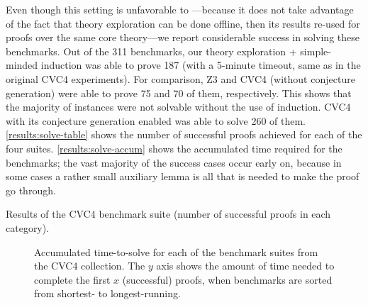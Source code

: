 Even though this setting is unfavorable to \TheSy---because it does not take advantage of the fact that theory exploration can be done offline, then its results re-used for proofs over the same core theory---we report considerable success in solving these benchmarks.
Out of the 311 benchmarks, our theory exploration + simple-minded induction was able to prove 187 (with a 5-minute timeout, same as in the original CVC4 experiments).
For comparison, Z3 and CVC4 (without conjecture generation) were able to prove 75 and 70 of them, respectively.
This shows that the majority of instances were not solvable without the use of induction.
CVC4 with its conjecture generation enabled was able to solve 260 of them.
\autoref{results:solve-table} shows the number of successful proofs achieved for each of the four suites.
\autoref{results:solve-accum} shows the accumulated time required for the benchmarks; the vast majority of the success cases occur early on, because in some cases a rather small auxiliary lemma is all that is needed to make the proof go through.

\begin{table}[t]
\centering

\vspace{5pt}
\caption{Results of the CVC4 benchmark suite (number of successful proofs in each category).}
\label{results:solve-table}
\end{table}

\begin{figure}[t]
    \centering
    
    \caption[Accumulated time-to-solve CVC4 benchmarks]{Accumulated time-to-solve for each of the benchmark suites from the CVC4 collection.
    The $y$ axis shows the amount of time needed to complete the first $x$ (successful) proofs, when benchmarks are sorted from shortest- to longest-running.}
    \label{results:solve-accum}
\end{figure}